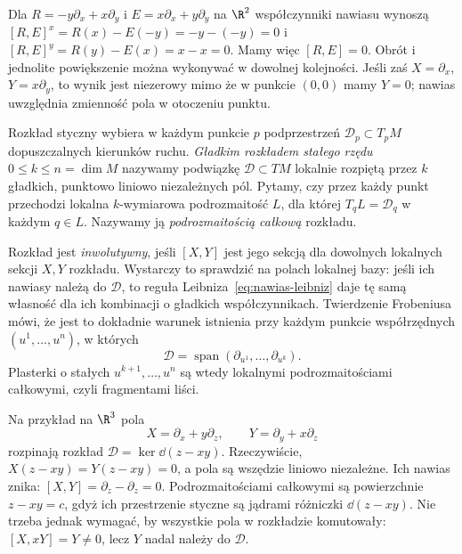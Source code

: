 \begin{przyklad}
Dla $R=-y\partial_x+x\partial_y$ i $E=x\partial_x+y\partial_y$
na $\R^2$ współczynniki nawiasu wynoszą
$[R,E]^x=R(x)-E(-y)=-y-(-y)=0$ i
$[R,E]^y=R(y)-E(x)=x-x=0$.
Mamy więc $[R,E]=0$. Obrót i jednolite powiększenie
można wykonywać w dowolnej kolejności. Jeśli zaś
$X=\partial_x$, $Y=x\partial_y$, to wynik jest niezerowy
mimo że w punkcie $(0,0)$ mamy $Y=0$; nawias uwzględnia zmienność
pola w otoczeniu punktu.
\end{przyklad}



\begin{uwaga}
Rozkład styczny wybiera w każdym punkcie $p$ podprzestrzeń
$\mathcal D_p\subset T_pM$ dopuszczalnych kierunków ruchu.
\emph{Gładkim rozkładem stałego rzędu} $0\leq k\leq n=\dim M$
nazywamy podwiązkę $\mathcal D\subset TM$ lokalnie rozpiętą
przez $k$ gładkich, punktowo liniowo niezależnych pól.
Pytamy, czy przez każdy punkt przechodzi lokalna
$k$-wymiarowa podrozmaitość $L$, dla której
$T_qL=\mathcal D_q$ w każdym $q\in L$.
Nazywamy ją \emph{podrozmaitością całkową} rozkładu.

Rozkład jest \emph{inwolutywny}, jeśli $[X,Y]$ jest jego sekcją
dla dowolnych lokalnych sekcji $X,Y$ rozkładu.
Wystarczy to sprawdzić na polach lokalnej bazy:
jeśli ich nawiasy należą do $\mathcal D$, to reguła
Leibniza~\eqref{eq:nawias-leibniz} daje tę samą własność
dla ich kombinacji o gładkich współczynnikach.
Twierdzenie Frobeniusa mówi, że jest to dokładnie warunek
istnienia przy każdym punkcie współrzędnych $(u^1,\ldots,u^n)$,
w których
\[
 \mathcal D=\operatorname{span}
 (\partial_{u^1},\ldots,\partial_{u^k}).
\]
Plasterki o stałych $u^{k+1},\ldots,u^n$ są wtedy lokalnymi
podrozmaitościami całkowymi, czyli fragmentami liści.

Na przykład na $\R^3$ pola
\[
 X=\partial_x+y\partial_z,\qquad
 Y=\partial_y+x\partial_z
\]
rozpinają rozkład $\mathcal D=\ker\dd(z-xy)$.
Rzeczywiście, $X(z-xy)=Y(z-xy)=0$, a pola są wszędzie
liniowo niezależne. Ich nawias znika:
$[X,Y]=\partial_z-\partial_z=0$.
Podrozmaitościami całkowymi są powierzchnie $z-xy=c$,
gdyż ich przestrzenie styczne są jądrami różniczki $\dd(z-xy)$.
Nie trzeba jednak wymagać, by wszystkie pola w rozkładzie
komutowały: $[X,xY]=Y\ne0$, lecz $Y$ nadal należy do
$\mathcal D$.


\end{uwaga}
